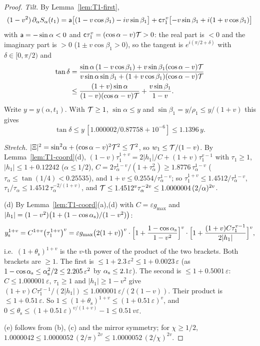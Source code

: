 \begin{proof}
\emph{Tilt.} By Lemma~\ref{lem:T1-first},
\[
(1-v^2)\,\partial_\alpha S_\alpha(t_1)=\mathsf a\bigl[(1-v\cos\beta_1)-iv\sin\beta_1\bigr]+\mathsf c\tau_1^v\bigl[-v\sin\beta_1+i(1+v\cos\beta_1)\bigr]
\]
with $\mathsf a=-\sin\alpha<0$ and $\mathsf c\tau_1^v=(\cos\alpha-v)\mathcal T>0$: the real part is $<0$ and the imaginary part is $>0$
($1\pm v\cos\beta_1>0$), so the tangent is $e^{i(\pi/2+\delta)}$ with $\delta\in[0,\pi/2)$ and
\begin{align*}
\tan\delta&=\frac{\sin\alpha\,(1-v\cos\beta_1)+v\sin\beta_1(\cos\alpha-v)\mathcal T}{v\sin\alpha\sin\beta_1+(1+v\cos\beta_1)(\cos\alpha-v)\mathcal T}\\
&\le\frac{(1+v)\sin\alpha}{(1-v)(\cos\alpha-v)\mathcal T}+\frac{v\sin\beta_1}{1-v}.
\end{align*}
Write $y=y(\alpha,t_1)$. With $\mathcal T\ge1$, $\sin\alpha\le y$ and $\sin\beta_1=y/\rho_1\le y/(1+v)$ this gives
\[
\tan\delta\le y\,[1.000002/0.87758+10^{-6}]\le1.1396\,y .
\]

\emph{Stretch.} $|\Xi|^2=\sin^2\!\alpha+(\cos\alpha-v)^2\mathcal T^2\le\mathcal T^2$, so $w_1\le\mathcal T/(1-v)$. By Lemma~\ref{lem:T1-coord}(d),
$(1-v)\tau_1^{1+v}=2|h_1|/C+(1+v)\tau_1^{v-1}$ with $\tau_1\ge1$, $|h_1|\le1+0.12242$ ($\alpha\le1/2$),
$C=2\tau_\alpha^{1-v}/(1+\tau_\alpha^2)\ge1.8776\,\tau_\alpha^{1-v}$ ($\tau_\alpha\le\tan(1/4)<0.25535$), and
$1+v\le0.2554/\tau_\alpha^{1-v}$; so $\tau_1^{1+v}\le1.4512/\tau_\alpha^{1-v}$, $\tau_1/\tau_\alpha\le1.4512\,\tau_\alpha^{-2/(1+v)}$, and
$\mathcal T\le1.4512^v\tau_\alpha^{-2v}\le1.0000004\,(2/\alpha)^{2v}$.

(d) By Lemma~\ref{lem:T1-coord}(a),(d) with $C=\varepsilon g_{\max}$ and $|h_1|=(1-v^2)\bigl(1+(1-\cos\alpha_{\mathrm s})/(1-v^2)\bigr)$:
\[
y_{\mathrm s}^{1+v}=C^{1+v}\bigl(\tau_1^{1+v}\bigr)^v=\varepsilon g_{\max}\bigl(2(1+v)\bigr)^v\cdot
\Bigl[1+\frac{1-\cos\alpha_{\mathrm s}}{1-v^2}\Bigr]^v\cdot\Bigl[1+\frac{(1+v)C\tau_1^{v-1}}{2|h_1|}\Bigr]^v,
\]
i.e.\ $(1+\theta_{\mathrm s})^{1+v}$ is the $v$-th power of the product of the two brackets. Both brackets are $\ge1$. The first is
$\le1+2.3\,\varepsilon^2\le1+0.0023\,\varepsilon$ (as $1-\cos\alpha_{\mathrm s}\le\alpha_{\mathrm s}^2/2\le2.205\,\varepsilon^2$ by $\alpha_{\mathrm s}\le2.1\varepsilon$). The second is
$\le1+0.5001\,\varepsilon$: $C\le1.000001\,\varepsilon$, $\tau_1\ge1$ and $|h_1|\ge1-v^2$ give
$(1+v)C\tau_1^{v-1}/(2|h_1|)\le1.000001\,\varepsilon/(2(1-v))$. Their product is $\le1+0.51\,\varepsilon$. So
$1\le(1+\theta_{\mathrm s})^{1+v}\le(1+0.51\,\varepsilon)^v$, and
$0\le\theta_{\mathrm s}\le(1+0.51\,\varepsilon)^{v/(1+v)}-1\le0.51\,v\varepsilon$.

(e) follows from (b), (c) and the mirror symmetry; for $\chi\ge1/2$,
$1.0000042\le1.0000052\,(2/\pi)^{2v}\le1.0000052\,(2/\chi)^{2v}$.
\end{proof}

